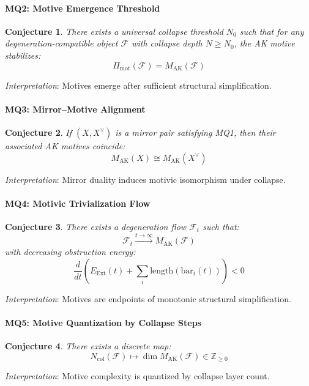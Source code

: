 \documentclass[11pt]{article}
\newtheorem{conjecture}{Conjecture}[section]
\begin{document}
\bigskip

\paragraph{MQ2: Motive Emergence Threshold}
\begin{conjecture}
There exists a universal collapse threshold $N_0$ such that for any degeneration-compatible object $\mathcal{F}$ with collapse depth $N \geq N_0$, the AK motive stabilizes:
\[
\Pi_{\mathrm{mot}}(\mathcal{F}) = M_{\mathrm{AK}}(\mathcal{F})
\]
\end{conjecture}
\textit{Interpretation}: Motives emerge after sufficient structural simplification.

\bigskip

\paragraph{MQ3: Mirror–Motive Alignment}
\begin{conjecture}
If $(X, X^{\vee})$ is a mirror pair satisfying MQ1, then their associated AK motives coincide:
\[
M_{\mathrm{AK}}(X) \cong M_{\mathrm{AK}}(X^{\vee})
\]
\end{conjecture}
\textit{Interpretation}: Mirror duality induces motivic isomorphism under collapse.

\bigskip

\paragraph{MQ4: Motivic Trivialization Flow}
\begin{conjecture}
There exists a degeneration flow $\mathcal{F}_t$ such that:
\[
\mathcal{F}_t \xrightarrow{t \to \infty} M_{\mathrm{AK}}(\mathcal{F})
\]
with decreasing obstruction energy:
\[
\frac{d}{dt} \left( E_{\mathrm{Ext}}(t) + \sum_i \text{length}(\mathrm{bar}_i(t)) \right) < 0
\]
\end{conjecture}
\textit{Interpretation}: Motives are endpoints of monotonic structural simplification.

\bigskip

\paragraph{MQ5: Motive Quantization by Collapse Steps}
\begin{conjecture}
There exists a discrete map:
\[
N_{\mathrm{col}}(\mathcal{F}) \mapsto \dim M_{\mathrm{AK}}(\mathcal{F}) \in \mathbb{Z}_{\geq 0}
\]
\end{conjecture}
\textit{Interpretation}: Motive complexity is quantized by collapse layer count.
\end{document}
